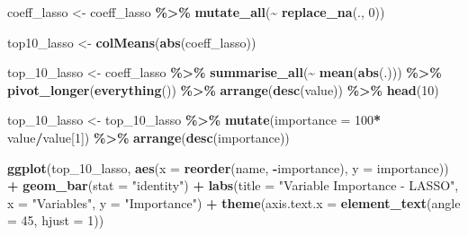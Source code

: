 \documentclass[
]{article}
\newenvironment{Shaded}{\begin{snugshade}}{\end{snugshade}}
\newcommand{\AttributeTok}[1]{\textcolor[rgb]{0.13,0.29,0.53}{#1}}
\newcommand{\DecValTok}[1]{\textcolor[rgb]{0.00,0.00,0.81}{#1}}
\newcommand{\FunctionTok}[1]{\textcolor[rgb]{0.13,0.29,0.53}{\textbf{#1}}}
\newcommand{\NormalTok}[1]{#1}
\newcommand{\OtherTok}[1]{\textcolor[rgb]{0.56,0.35,0.01}{#1}}
\newcommand{\SpecialCharTok}[1]{\textcolor[rgb]{0.81,0.36,0.00}{\textbf{#1}}}
\newcommand{\StringTok}[1]{\textcolor[rgb]{0.31,0.60,0.02}{#1}}
\begin{document}
\begin{Shaded}
\begin{Highlighting}[]
\NormalTok{coeff\_lasso }\OtherTok{\textless{}{-}}\NormalTok{ coeff\_lasso }\SpecialCharTok{\%\textgreater{}\%} \FunctionTok{mutate\_all}\NormalTok{(}\SpecialCharTok{\textasciitilde{}} \FunctionTok{replace\_na}\NormalTok{(., }\DecValTok{0}\NormalTok{))}

\NormalTok{top10\_lasso }\OtherTok{\textless{}{-}}  \FunctionTok{colMeans}\NormalTok{(}\FunctionTok{abs}\NormalTok{(coeff\_lasso))}

\NormalTok{top\_10\_lasso }\OtherTok{\textless{}{-}}\NormalTok{ coeff\_lasso }\SpecialCharTok{\%\textgreater{}\%}
  \FunctionTok{summarise\_all}\NormalTok{(}\SpecialCharTok{\textasciitilde{}} \FunctionTok{mean}\NormalTok{(}\FunctionTok{abs}\NormalTok{(.))) }\SpecialCharTok{\%\textgreater{}\%}
  \FunctionTok{pivot\_longer}\NormalTok{(}\FunctionTok{everything}\NormalTok{()) }\SpecialCharTok{\%\textgreater{}\%}
  \FunctionTok{arrange}\NormalTok{(}\FunctionTok{desc}\NormalTok{(value)) }\SpecialCharTok{\%\textgreater{}\%}
  \FunctionTok{head}\NormalTok{(}\DecValTok{10}\NormalTok{)}

\NormalTok{top\_10\_lasso }\OtherTok{\textless{}{-}}\NormalTok{ top\_10\_lasso }\SpecialCharTok{\%\textgreater{}\%} \FunctionTok{mutate}\NormalTok{(}\AttributeTok{importance =} \DecValTok{100}\SpecialCharTok{*}\NormalTok{ value}\SpecialCharTok{/}\NormalTok{value[}\DecValTok{1}\NormalTok{]) }\SpecialCharTok{\%\textgreater{}\%} \FunctionTok{arrange}\NormalTok{(}\FunctionTok{desc}\NormalTok{(importance))}

\FunctionTok{ggplot}\NormalTok{(top\_10\_lasso, }\FunctionTok{aes}\NormalTok{(}\AttributeTok{x =} \FunctionTok{reorder}\NormalTok{(name, }\SpecialCharTok{{-}}\NormalTok{importance), }\AttributeTok{y =}\NormalTok{ importance)) }\SpecialCharTok{+}
  \FunctionTok{geom\_bar}\NormalTok{(}\AttributeTok{stat =} \StringTok{"identity"}\NormalTok{) }\SpecialCharTok{+}
  \FunctionTok{labs}\NormalTok{(}\AttributeTok{title =} \StringTok{"Variable Importance {-} LASSO"}\NormalTok{,}
       \AttributeTok{x =} \StringTok{"Variables"}\NormalTok{,}
       \AttributeTok{y =} \StringTok{"Importance"}\NormalTok{) }\SpecialCharTok{+}
  \FunctionTok{theme}\NormalTok{(}\AttributeTok{axis.text.x =} \FunctionTok{element\_text}\NormalTok{(}\AttributeTok{angle =} \DecValTok{45}\NormalTok{, }\AttributeTok{hjust =} \DecValTok{1}\NormalTok{))}
\end{Highlighting}
\end{Shaded}
\end{document}
